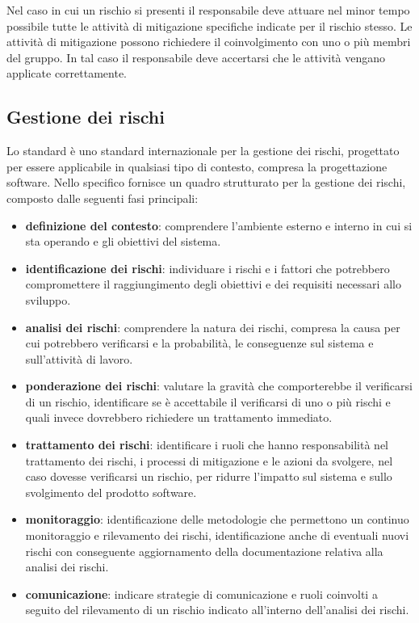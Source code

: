 \begin{enumerate}
    Nel caso in cui un rischio si presenti il responsabile deve attuare nel minor tempo possibile tutte le attività di mitigazione specifiche indicate per il rischio stesso.
    Le attività di mitigazione possono richiedere il coinvolgimento con uno o più membri del gruppo.
    In tal caso il responsabile deve accertarsi che le attività vengano applicate correttamente. 
\end{enumerate}

\subsection{Gestione dei rischi}
Lo standard  è uno standard internazionale per la gestione dei rischi, progettato per essere applicabile  in qualsiasi tipo di contesto, compresa la progettazione software.
Nello specifico fornisce un quadro strutturato per la gestione dei rischi, composto dalle seguenti fasi principali: 
\begin{itemize}
    \item \textbf{definizione del contesto}: comprendere l'ambiente esterno e interno in cui si sta operando e gli obiettivi del sistema.
    \item \textbf{identificazione dei rischi}: individuare i rischi e i fattori che potrebbero compromettere il raggiungimento degli obiettivi e dei requisiti necessari allo sviluppo.
    \item \textbf{analisi dei rischi}:  comprendere la natura dei rischi, compresa la causa per cui potrebbero verificarsi e la probabilità, le conseguenze sul sistema e sull'attività di lavoro.
    \item \textbf{ponderazione dei rischi}: valutare la gravità che comporterebbe il verificarsi di un rischio, identificare se è accettabile il verificarsi di uno o più rischi e quali invece dovrebbero richiedere un trattamento immediato.
    \item \textbf{trattamento dei rischi}: identificare i ruoli che hanno responsabilità nel trattamento dei rischi, i processi di mitigazione e le azioni da svolgere, nel caso dovesse verificarsi un rischio, per ridurre l'impatto sul sistema e sullo svolgimento del prodotto software. 
    \item \textbf{monitoraggio}: identificazione delle metodologie che permettono un continuo monitoraggio e rilevamento dei rischi, identificazione anche di eventuali nuovi rischi con conseguente aggiornamento della documentazione relativa alla analisi dei rischi.
    \item \textbf{comunicazione}: indicare strategie di comunicazione e ruoli coinvolti a seguito del rilevamento di un rischio indicato all'interno dell'analisi dei rischi.
\end{itemize}
